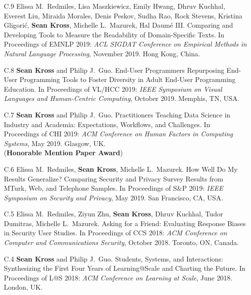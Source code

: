 \begin{bibenum}

\item[C.9] Elissa M.\ Redmiles, Lisa Maszkiewicz, Emily Hwang, Dhruv Kuchhal,
Everest Liu, Miraida Morales, Denis Peskov, Sudha Rao, Rock Stevens, 
Kristina Gligorić, \textbf{Sean Kross}, Michelle L.\ Mazurek, Hal Daumé III.
Comparing and Developing Tools to Measure the Readability of Domain-Specific 
Texts. In Proceedings of EMNLP 2019: \emph{ACL SIGDAT Conference on Empirical 
Methods in Natural Language Processing}, November 2019. Hong Kong, China.

\item[C.8] \textbf{Sean Kross} and Philip J.\ Guo. End-User Programmers 
Repurposing End-User Programming Tools to Foster Diversity in Adult End-User 
Programming Education. In Proceedings of VL/HCC 2019: \emph{IEEE
Symposium on Visual Languages and Human-Centric Computing}, October 2019. 
Memphis, TN, USA.


\item[C.7] \textbf{Sean Kross} and Philip J.\ Guo. Practitioners Teaching Data 
Science in Industry and Academia: Expectations, Workflows, and Challenges.
In Proceedings of CHI 2019: \emph{ACM Conference on Human Factors in Computing 
Systems}, May 2019. Glasgow, UK. \\ ({\textbf{Honorable Mention Paper Award}})

\item[C.6] Elissa M.\ Redmiles, \textbf{Sean Kross}, Michelle L.\ Mazurek. 
How Well Do My Results Generalize? Comparing Security and Privacy Survey Results
from MTurk, Web, and Telephone Samples. In Proceedings of S\&P 2019: 
\emph{IEEE Symposium on Security and Privacy}, May 2019. San Francisco, CA, USA.

\item[C.5] Elissa M.\ Redmiles, Ziyun Zhu, \textbf{Sean Kross}, Dhruv Kuchhal,
Tudor Dumitras, Michelle L.\ Mazurek. Asking for a Friend: Evaluating Response 
Biases in Security User Studies. In Proceedings of CCS 2018: \emph{ACM 
Conference on Computer and Communications Security}, October 2018. Toronto, ON, 
Canada.

\item[C.4] \textbf{Sean Kross} and Philip J.\ Guo. Students, Systems,
and Interactions: Synthesizing the First Four Years of Learning@Scale
and Charting the Future. In Proceedings of L@S 2018: \emph{ACM
Conference on Learning at Scale}, June 2018. London, UK.


\end{bibenum}
